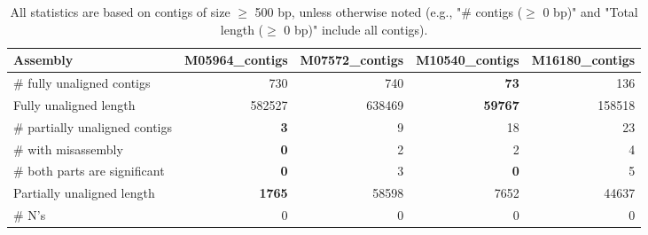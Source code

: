 \documentclass[12pt,a4paper]{article}
\begin{document}
\begin{table}[ht]
\begin{center}
\caption{All statistics are based on contigs of size $\geq$ 500 bp, unless otherwise noted (e.g., "\# contigs ($\geq$ 0 bp)" and "Total length ($\geq$ 0 bp)" include all contigs).}
\begin{tabular}{|l*{4}{|r}|}
\hline
Assembly & M05964\_contigs & M07572\_contigs & M10540\_contigs & M16180\_contigs \\ \hline
\# fully unaligned contigs & 730 & 740 & {\bf 73} & 136 \\ \hline
Fully unaligned length & 582527 & 638469 & {\bf 59767} & 158518 \\ \hline
\# partially unaligned contigs & {\bf 3} & 9 & 18 & 23 \\ \hline
\hspace{5mm}\# with misassembly & {\bf 0} & 2 & 2 & 4 \\ \hline
\hspace{5mm}\# both parts are significant & {\bf 0} & 3 & {\bf 0} & 5 \\ \hline
Partially unaligned length & {\bf 1765} & 58598 & 7652 & 44637 \\ \hline
\# N's & 0 & 0 & 0 & 0 \\ \hline
\end{tabular}
\end{center}
\end{table}
\end{document}
